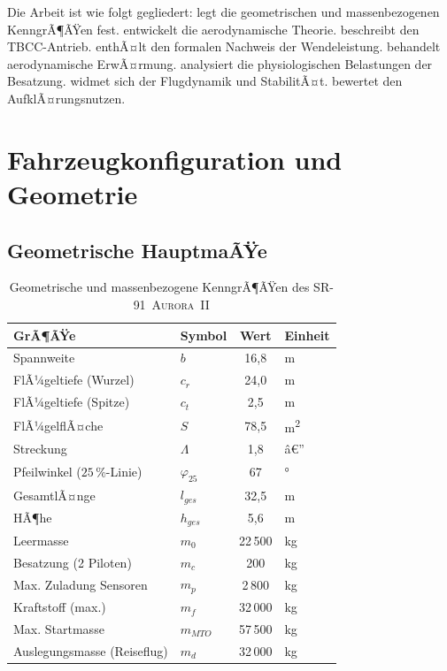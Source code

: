 ﻿\documentclass[12pt,a4paper]{article}
\theoremstyle{plain}
\theoremstyle{definition}
\theoremstyle{remark}
\newcommand{\SR}{\textsc{SR-91~Aurora~II}}
\begin{document}
Die Arbeit ist wie folgt gegliedert:
 legt die geometrischen und massenbezogenen KenngrÃ¶ÃŸen fest.
 entwickelt die aerodynamische Theorie.
 beschreibt den TBCC-Antrieb.
 enthÃ¤lt den formalen Nachweis der Wendeleistung.
 behandelt aerodynamische ErwÃ¤rmung.
 analysiert die physiologischen Belastungen der Besatzung.
 widmet sich der Flugdynamik und StabilitÃ¤t.
 bewertet den AufklÃ¤rungsnutzen.

\section{Fahrzeugkonfiguration und Geometrie}
\label{sec:config}

\subsection{Geometrische HauptmaÃŸe}

\begin{table}[H]
\centering
\caption{Geometrische und massenbezogene KenngrÃ¶ÃŸen des \SR{}}
\label{tab:geo}
\begin{tabular}{llcl}
\toprule
GrÃ¶ÃŸe & Symbol & Wert & Einheit \\
\midrule
Spannweite & $b$ & 16{,}8 & \si{\metre} \\
FlÃ¼geltiefe (Wurzel) & $c_r$ & 24{,}0 & \si{\metre} \\
FlÃ¼geltiefe (Spitze) & $c_t$ & 2{,}5 & \si{\metre} \\
FlÃ¼gelflÃ¤che & $S$ & 78{,}5 & \si{\metre\squared} \\
Streckung & $\Lambda$ & 1{,}8 & â€” \\
Pfeilwinkel ($25\,\%$-Linie) & $\varphi_{25}$ & 67 & \si{\degree} \\
GesamtlÃ¤nge & $l_{ges}$ & 32{,}5 & \si{\metre} \\
HÃ¶he & $h_{ges}$ & 5{,}6 & \si{\metre} \\
\midrule
Leermasse & $m_0$ & 22\,500 & \si{\kilo\gram} \\
Besatzung (2 Piloten) & $m_c$ & 200 & \si{\kilo\gram} \\
Max. Zuladung Sensoren & $m_p$ & 2\,800 & \si{\kilo\gram} \\
Kraftstoff (max.) & $m_f$ & 32\,000 & \si{\kilo\gram} \\
Max. Startmasse & $m_{MTO}$ & 57\,500 & \si{\kilo\gram} \\
Auslegungsmasse (Reiseflug) & $m_d$ & 32\,000 & \si{\kilo\gram} \\
\bottomrule
\end{tabular}
\end{table}
\end{document}
